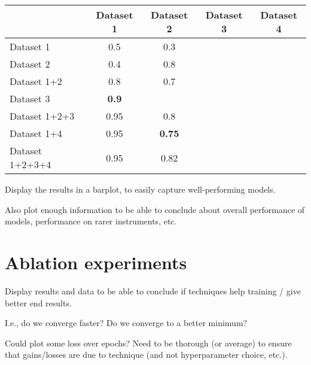 \begin{center}
    \begin{tabular}{|l|cccc|}
    \hline
                     & Dataset 1 & Dataset 2 & Dataset 3 & Dataset 4 \\
    \hline
    Dataset 1        & 0.5       & 0.3          &           &           \\
    Dataset 2        & \cellcolor{blue!10}0.4       & 0.8          &           &           \\
    Dataset 1+2      & 0.8       & 0.7          &           &           \\
    Dataset 3        & \cellcolor{blue!10}\textbf{0.9}       & \cellcolor{blue!10}{0.6}          &           &           \\
    Dataset 1+2+3    & 0.95      & 0.8          &           &           \\   
    Dataset 1+4      & 0.95      & \cellcolor{blue!10}\textbf{0.75}          &           &           \\   
    Dataset 1+2+3+4  & 0.95      & 0.82          &           &           \\   
    \hline

    \end{tabular}
\end{center}


Display the results in a barplot, to easily capture well-performing models.

Also plot enough information to be able to conclude about overall performance of models, performance on rarer instruments, etc.


\section{Ablation experiments}

Display results and data to be able to conclude if techniques help training / give better end results.

I.e., do we converge faster? Do we converge to a better minimum? 

Could plot some loss over epochs? Need to be thorough (or average) to ensure that gains/losses are due to technique (and not hyperparameter choice, etc.). 